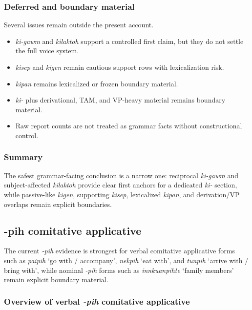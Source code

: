 \documentclass[
  11pt,
  a4paper,
]{article}
\providecommand{\tightlist}{%
  \setlength{\itemsep}{0pt}\setlength{\parskip}{0pt}}
\newcommand{\tdim}[1]{\textit{#1}}
\newcommand{\glossquote}[1]{`#1'}
\begin{document}
\subsubsection{Deferred and boundary
material}\label{deferred-and-boundary-material-6}

Several issues remain outside the present account.

\begin{itemize}
\tightlist
\item
  \tdim{ki-gawm} and \tdim{kilaktoh} support a controlled first claim,
  but they do not settle the full voice system.
\item
  \tdim{kisep} and \tdim{kigen} remain cautious support rows with
  lexicalization risk.
\item
  \tdim{kipan} remains lexicalized or frozen boundary material.
\item
  \tdim{ki-} plus derivational, TAM, and VP-heavy material remains
  boundary material.
\item
  Raw report counts are not treated as grammar facts without
  constructional control.
\end{itemize}

\subsubsection{Summary}\label{summary-7}

The safest grammar-facing conclusion is a narrow one: reciprocal
\tdim{ki-gawm} and subject-affected \tdim{kilaktoh} provide clear first
anchors for a dedicated \tdim{ki-} section, while passive-like
\tdim{kigen}, supporting \tdim{kisep}, lexicalized \tdim{kipan}, and
derivation/VP overlaps remain explicit boundaries.

\subsection{-pih comitative
applicative}\label{pih-comitative-applicative}

The current \tdim{-pih} evidence is strongest for verbal comitative
applicative forms such as \tdim{paipih}
\glossquote{go with / accompany}, \tdim{nekpih} \glossquote{eat with},
and \tdim{tunpih} \glossquote{arrive with / bring with}, while nominal
\tdim{-pih} forms such as \tdim{innkuanpihte}
\glossquote{family members} remain explicit boundary material.

\subsubsection{\texorpdfstring{Overview of verbal \tdim{-pih} comitative
applicative}{Overview of verbal  comitative applicative}}\label{overview-of-verbal-comitative-applicative}
\end{document}
